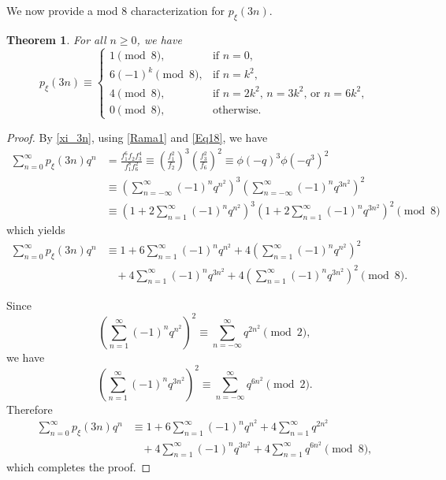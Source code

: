 \documentclass[12pt]{article}
\newtheorem{theorem}{Theorem}[section]
\begin{document}
We now provide a mod 8 characterization for $p_{\xi}(3n).$  
\begin{theorem} For all $n \geq 0$, we have %
$$p_{\xi}(3n) \equiv  
\begin{cases}
1 \pmod{8}, & \mbox{if $n=0$} ,\\
6(-1)^k \pmod{8}, & \mbox{if $n=k^2$}, \\
4 \pmod{8}, & \mbox{if $n = 2k^2$, $n = 3k^2$, or $n = 6k^2$}, \\
0 \pmod{8}, & \mbox{otherwise}.
\end{cases}$$
	\label{T4}
\end{theorem}

\begin{proof}
By \eqref{xi_3n}, using \eqref{Rama1} and \eqref{Eq18}, we have
\begin{align*}
\sum_{n=0}^{\infty} p_{\xi}(3n)q^n & = \frac{f_1^6f_{2}f_{3}^4}{f_{1}^8f_{6}^2} \equiv \left( \frac{f_1^2}{f_{2}} \right)^3 \left( \frac{f_3^2}{f_{6}} \right)^2 \equiv \phi(-q)^3 \phi(-q^3)^2 \\
& \equiv \left( \sum_{n=-\infty}^{\infty} (-1)^n q^{n^2} \right)^3 \left( \sum_{n=-\infty}^{\infty} (-1)^n q^{3n^2} \right)^2 \\
& \equiv \left(1+ 2\sum_{n=1}^{\infty} (-1)^n q^{n^2} \right)^3 \left(1+ 2\sum_{n=1}^{\infty} (-1)^n q^{3n^2} \right)^2 \pmod{8}
\end{align*}
which yields
\begin{align*}
\sum_{n=0}^{\infty} p_{\xi}(3n)q^n & \equiv 1 + 6\sum_{n=1}^{\infty} (-1)^n q^{n^2} + 4 \left( \sum_{n=1}^{\infty} (-1)^n q^{n^2} \right)^2 \\ 
& \ \ \ \ + 4\sum_{n=1}^{\infty} (-1)^n q^{3n^2} + 4 \left( \sum_{n=1}^{\infty} (-1)^n q^{3n^2} \right)^2 \pmod{8}.
\end{align*}

Since 
$$\left( \sum_{n=1}^{\infty} (-1)^n q^{n^2} \right)^2 \equiv \sum_{n=-\infty}^{\infty} q^{2n^2} \pmod{2},$$
we have
$$\left( \sum_{n=1}^{\infty} (-1)^n q^{3n^2} \right)^2 \equiv \sum_{n=-\infty}^{\infty} q^{6n^2} \pmod{2}.$$
Therefore
\begin{align*}
\sum_{n=0}^{\infty} p_{\xi}(3n)q^n & \equiv 1 + 6\sum_{n=1}^{\infty} (-1)^n q^{n^2} + 4\sum_{n=1}^{\infty} q^{2n^2} \\ 
& \ \ \ \ + 4\sum_{n=1}^{\infty} (-1)^n q^{3n^2} + 4 \sum_{n=1}^{\infty} q^{6n^2} \pmod{8},
\end{align*}
which completes the proof.
\end{proof}
\end{document}
